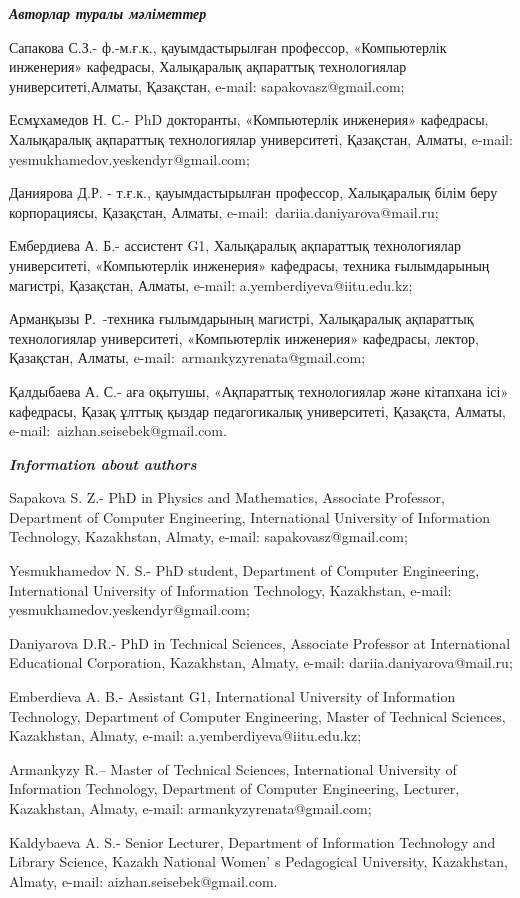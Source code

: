\begin{authorinfo}
\hspace{1em}\emph{{\bfseries Авторлар туралы мәліметтер}}

Сапакова С.З.- ф.-м.ғ.к., қауымдастырылған профессор, «Компьютерлік
инженерия» кафедрасы, Халықаралық ақпараттық технологиялар
университеті,Алматы, Қазақстан, e-mail: sapakovasz@gmail.com;

Есмұхамедов Н. С.- PhD докторанты, «Компьютерлік инженерия» кафедрасы,
Халықаралық ақпараттық технологиялар университеті, Қазақстан, Алматы,
e-mail: yesmukhamedov.yeskendyr@gmail.com;

Даниярова Д.Р. - т.ғ.к., қауымдастырылған профессор, Халықаралық білім
беру корпорациясы, Қазақстан, Алматы, e-mail:~dariia.daniyarova@mail.ru;

Ембердиева А. Б.- ассистент G1, Халықаралық ақпараттық технологиялар
университеті, «Компьютерлік инженерия» кафедрасы, техника ғылымдарының
магистрі, Қазақстан, Алматы,
e-mail: a.yemberdiyeva@iitu.edu.kz;

Арманқызы Р.~-техника ғылымдарының магистрі, Халықаралық ақпараттық
технологиялар университеті, «Компьютерлік инженерия» кафедрасы, лектор,
Қазақстан, Алматы, e-mail:~armankyzyrenata@gmail.com;

Қалдыбаева А. С.- аға оқытушы, «Ақпараттық технологиялар және кітапхана
ісі» кафедрасы, Қазақ ұлттық қыздар педагогикалық университеті,
Қазақста, Алматы, e-mail:~aizhan.seisebek@gmail.com.

\hspace{1em}\emph{{\bfseries Information about authors}}

Sapakova S. Z.- PhD in Physics and Mathematics, Associate Professor,
Department of Computer Engineering, International University of
Information Technology, Kazakhstan, Almaty, e-mail:
sapakovasz@gmail.com;

Yesmukhamedov N. S.- PhD student, Department of Computer Engineering,
International University of Information Technology, Kazakhstan, e-mail:
yesmukhamedov.yeskendyr@gmail.com;

Daniyarova D.R.- PhD in Technical Sciences, Associate Professor at
International Educational Corporation, Kazakhstan, Almaty, e-mail:
dariia.daniyarova@mail.ru;

Emberdieva A. B.- Assistant G1, International University of Information
Technology, Department of Computer Engineering, Master of Technical
Sciences, Kazakhstan, Almaty, e-mail: a.yemberdiyeva@iitu.edu.kz;

Armankyzy R.-- Master of Technical Sciences, International University of
Information Technology, Department of Computer Engineering, Lecturer,
Kazakhstan, Almaty, e-mail: armankyzyrenata@gmail.com;

Kaldybaeva A. S.- Senior Lecturer, Department of Information Technology
and Library Science, Kazakh National Women' s Pedagogical
University, Kazakhstan, Almaty, e-mail: aizhan.seisebek@gmail.com.
\end{authorinfo}
